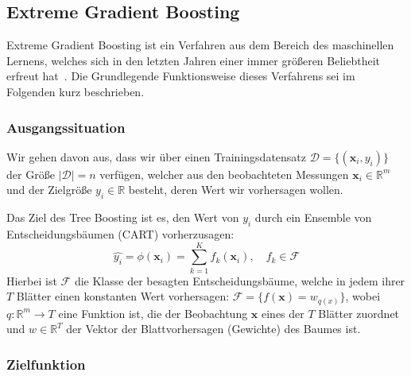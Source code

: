 \subsection{Extreme Gradient Boosting}
\label{sec:xgboost}

Extreme Gradient Boosting ist ein Verfahren aus dem Bereich des maschinellen Lernens, welches sich
in den letzten Jahren einer immer gr\"o{\ss}eren Beliebtheit erfreut hat~\cite{XGBoost}.
Die Grundlegende Funktionsweise dieses Verfahrens sei im Folgenden kurz beschrieben.

\subsubsection{Ausgangssituation}

Wir gehen davon aus, dass wir \"uber einen Trainingsdatensatz $\mathcal{D} = \{(\mathbf{x}_i, y_i)\}$
der Gr\"o{\ss}e $\left| \mathcal{D} \right| = n$ verf\"ugen, welcher aus den beobachteten Messungen $\mathbf{x}_i \in \mathbb{R}^m$
und der Zielgr\"o{\ss}e $y_i \in \mathbb{R}$ besteht, deren Wert wir vorhersagen wollen.

Das Ziel des Tree Boosting ist es, den Wert von $y_i$ durch ein Ensemble von Entscheidungsb\"aumen (CART)
vorherzusagen:
\begin{equation}
    \hat{y_i} = \phi(\mathbf{x}_i) =  \sum_{k=1}^K f_k(\mathbf{x}_i), \quad f_k \in \mathcal{F}
\end{equation}
Hierbei ist $\mathcal{F}$ die Klasse der besagten Entscheidungsb\"aume, welche in jedem ihrer $T$ Bl\"atter
einen konstanten Wert vorhersagen: $\mathcal{F} = \{f(\mathbf{x}) = w_{q(x)}\}$, wobei $q: \mathbb{R}^m \rightarrow T$
eine Funktion ist, die der Beobachtung $\mathbf{x}$ eines der $T$ Bl\"atter zuordnet und $w \in \mathbb{R}^T$ der Vektor
der Blattvorhersagen (Gewichte) des Baumes ist.

\subsubsection{Zielfunktion}

